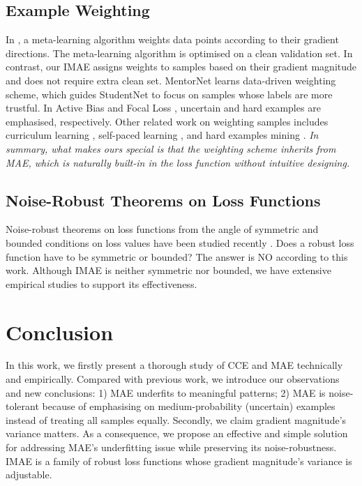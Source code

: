 \documentclass{article}
\begin{document}
\subsection{Example Weighting} 
In \cite{ren2018learning}, a meta-learning algorithm weights data points according to their gradient directions. The meta-learning algorithm is optimised on a clean validation set. In contrast, our IMAE assigns weights to samples based on their gradient magnitude and does not require extra clean set. 
MentorNet \cite{jiang2018mentornet} learns data-driven weighting scheme, which guides StudentNet to focus on samples whose labels are more trustful. 
In Active Bias \cite{chang2017active} and Focal Loss \cite{lin2017focal}, uncertain and hard examples are emphasised, respectively. 
Other related work on weighting samples includes curriculum learning \cite{bengio2009curriculum}, self-paced learning \cite{kumar2010self}, and hard examples mining \cite{shrivastava2016training,wang2019deep}. 
\textit{In summary, what makes ours special is that the weighting scheme inherits from MAE, which is naturally built-in in the loss function without intuitive designing.}

\subsection{Noise-Robust Theorems on Loss Functions} 
Noise-robust theorems on loss functions from the angle of symmetric and bounded conditions on loss values have been studied recently \cite{ghosh2017robust,zhang2018generalized,wang2019symmetric}. 
Does a robust loss function have to be symmetric or bounded? 
The answer is NO according to this work. 
Although IMAE is neither symmetric nor bounded, we have extensive empirical studies to support its effectiveness. 
 








\section{Conclusion}
In this work, we firstly present a thorough study of CCE and MAE technically and empirically. Compared with previous work, we introduce our observations and new conclusions: 
1) MAE underfits to meaningful patterns; 
2) MAE is noise-tolerant because of emphasising on medium-probability (uncertain) examples instead of treating all samples equally.
Secondly, we claim gradient magnitude's variance matters. As a consequence, we propose an effective and simple solution for addressing MAE's underfitting issue while preserving its noise-robustness. 
IMAE is a family of robust loss functions whose gradient magnitude's variance is adjustable. 
\end{document}
